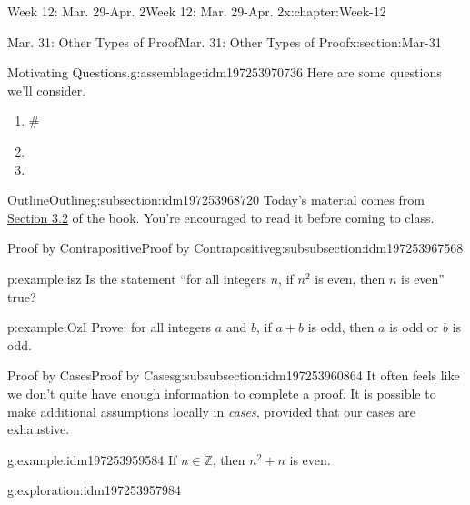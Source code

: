 \documentclass[oneside,10pt,]{book}
\numberwithin{equation}{section}
\def\Z{{\mathbb Z}}
\newcommand{\Z}{\mathbb Z}
\begin{document}
\begin{chapterptx}{Week 12: Mar. 29-Apr. 2}{}{Week 12: Mar. 29-Apr. 2}{}{}{x:chapter:Week-12}
\begin{sectionptx}{Mar. 31: Other Types of Proof}{}{Mar. 31: Other Types of Proof}{}{}{x:section:Mar-31}
\begin{introduction}{}%
\begin{assemblage}{Motivating Questions.}{g:assemblage:idm197253970736}%
Here are some questions we'll consider. %
\begin{enumerate}
\item{}\#%
\item{}%
\item{}%
\end{enumerate}
%
\end{assemblage}
\end{introduction}%
%
%
\typeout{************************************************}
\typeout{************************************************}
%
\begin{subsectionptx}{Outline}{}{Outline}{}{}{g:subsection:idm197253968720}
Today's material comes from \href{http://discrete.openmathbooks.org/dmoi3/sec_logic-proofs.html}{Section 3.2} of the book. You're encouraged to read it before coming to class.%
%
%
\typeout{************************************************}
\typeout{************************************************}
%
\begin{subsubsectionptx}{Proof by Contrapositive}{}{Proof by Contrapositive}{}{}{g:subsubsection:idm197253967568}
\begin{example}{}{p:example:isz}%
Is the statement ``for all integers \(n\), if \(n^2\) is even, then \(n\) is even'' true?%
\end{example}
\begin{example}{}{p:example:OzI}%
Prove: for all integers \(a\) and \(b\), if \(a + b\) is odd, then \(a\) is odd or \(b\) is odd.%
\end{example}
\end{subsubsectionptx}
%
%
\typeout{************************************************}
\typeout{************************************************}
%
\begin{subsubsectionptx}{Proof by Cases}{}{Proof by Cases}{}{}{g:subsubsection:idm197253960864}
It often feels like we don't quite have enough information to complete a proof. It is possible to make additional assumptions locally in \emph{cases}, provided that our cases are exhaustive.%
\begin{example}{}{g:example:idm197253959584}%
If \(n\in\Z\), then \(n^2+n\) is even.%
\end{example}
\begin{exploration}{}{g:exploration:idm197253957984}%

\end{exploration}
\end{subsubsectionptx}
\end{subsectionptx}
\end{sectionptx}
\end{chapterptx}
\end{document}
